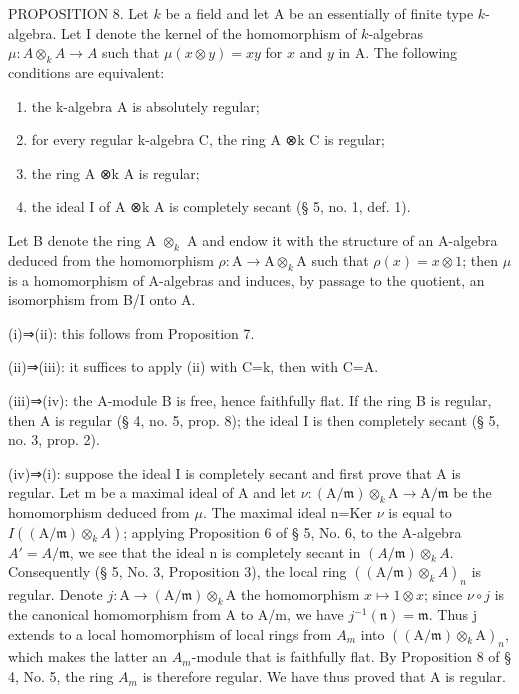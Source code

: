 PROPOSITION 8. Let \(k\) be a field and let A be an essentially of finite type \(k\)-algebra. Let I denote the kernel of the homomorphism of \(k\)-algebras \(\mu: A \otimes_k A \to A\) such that \(\mu(x \otimes y) = xy\) for \(x\) and \(y\) in A. The following conditions are equivalent:

\begin{enumerate}
\def\labelenumi{(\roman{enumi})}
\item
  the k-algebra A is absolutely regular;
\item
  for every regular k-algebra C, the ring A ⊗k C is regular;
\item
  the ring A ⊗k A is regular;
\item
  the ideal I of A ⊗k A is completely secant (§ 5, no. 1, def. 1).
\end{enumerate}

Let B denote the ring A \(\otimes_{k}\) A and endow it with the structure of an A-algebra deduced from the homomorphism \(\rho: \mathrm{A} \to \mathrm{A} \otimes_{k} \mathrm{A}\) such that \(\rho(x) = x \otimes 1\); then \(\mu\) is a homomorphism of A-algebras and induces, by passage to the quotient, an isomorphism from B/I onto A.

(i)⇒(ii): this follows from Proposition 7.

(ii)⇒(iii): it suffices to apply (ii) with C=k, then with C=A.

(iii)⇒(iv): the A-module B is free, hence faithfully flat. If the ring B is regular, then A is regular (§ 4, no. 5, prop. 8); the ideal I is then completely secant (§ 5, no. 3, prop. 2).

(iv)⇒(i): suppose the ideal I is completely secant and first prove that A is regular. Let m be a maximal ideal of A and let \(\nu:(\mathrm{A}/\mathfrak{m})\otimes_{k}\mathrm{A}\to\mathrm{A}/\mathfrak{m}\) be the homomorphism deduced from \(\mu\). The maximal ideal n=Ker \(\nu\) is equal to \(I((\mathrm{A}/\mathfrak{m})\otimes_{k}A)\); applying Proposition 6 of § 5, No. 6, to the A-algebra \(A'=A/\mathfrak m\), we see that the ideal n is completely secant in \((A/\mathfrak{m})\otimes_{k}A\). Consequently (§ 5, No. 3, Proposition 3), the local ring \(((\mathrm{A}/\mathfrak{m})\otimes_{k}A)_{n}\) is regular. Denote \(j:\mathrm{A}\to(\mathrm{A}/\mathfrak{m})\otimes_{k}\mathrm{A}\) the homomorphism \(x\mapsto1\otimes x\); since \(\nu\circ j\) is the canonical homomorphism from A to A/m, we have \(j^{-1}(\mathfrak{n})=\mathfrak{m}\). Thus j extends to a local homomorphism of local rings from \(A_{m}\) into \(((\mathrm{A}/\mathfrak{m})\otimes_{k}\mathrm{A})_{n}\), which makes the latter an \(A_{m}\)-module that is faithfully flat. By Proposition 8 of § 4, No. 5, the ring \(A_{m}\) is therefore regular. We have thus proved that A is regular.

